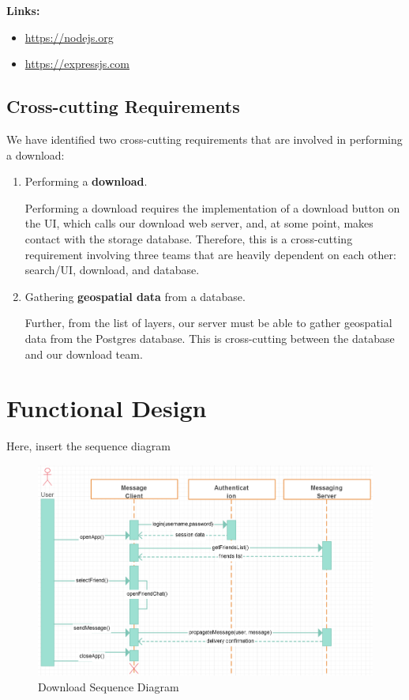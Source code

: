 \documentclass{article}
\begin{document}
	\textbf{Links:}
	\begin{itemize} 
		\item \url{https://nodejs.org}
		\item \url{https://expressjs.com}
	\end{itemize}
	
	\clearpage
	
	\subsection{Cross-cutting Requirements}
	
	We have identified two cross-cutting requirements that are involved in performing a download: 
	
	\begin{enumerate}
	\item Performing a \textbf{download}.
	
	Performing a download requires the implementation of a download button on the UI, which calls our download web server, and, at some point, makes contact with the storage database. Therefore, this is a cross-cutting requirement involving three teams that are heavily dependent on each other: search/UI, download, and database. \\
	
	\item Gathering \textbf{geospatial data} from a database.
	
	Further, from the list of layers, our server must be able to gather geospatial data from the Postgres database. This is cross-cutting between the database and our download team.
	
	\end{enumerate}
	
	\clearpage
	
	\section{Functional Design}
	
	Here, insert the sequence diagram 

	\begin{figure}[H]
		\begin{center}
			\caption{Download Sequence Diagram}
			\includegraphics[width=\textwidth]{images/sample-sequence-diagram.png}
		\end{center}
	\end{figure}
\end{document}
